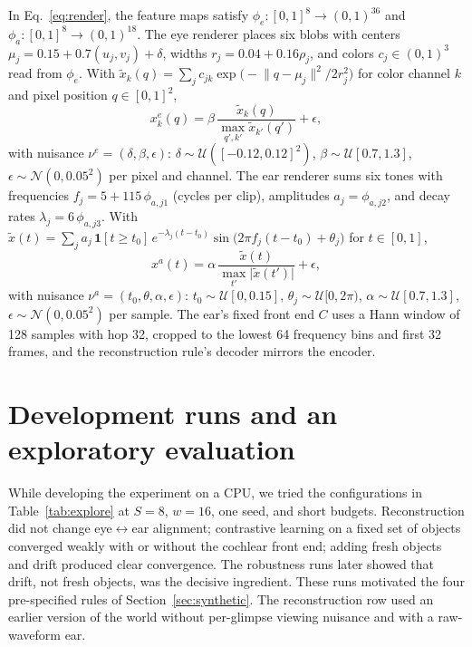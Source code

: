 \documentclass[11pt]{article}
\newcommand{\lr}{\ensuremath{\leftrightarrow}}
\begin{document}
In Eq.~\eqref{eq:render}, the feature maps satisfy $\phi_e:[0,1]^8\to(0,1)^{36}$ and $\phi_a:[0,1]^8\to(0,1)^{18}$. The eye renderer places six blobs with centers $\mu_j=0.15+0.7(u_j,v_j)+\delta$, widths $r_j=0.04+0.16\rho_j$, and colors $c_j\in(0,1)^3$ read from $\phi_e$. With $\tilde x_k(q)=\sum_j c_{jk}\exp\!\big(-\lVert q-\mu_j\rVert^2/2r_j^2\big)$ for color channel $k$ and pixel position $q\in[0,1]^2$,
\begin{equation}
  x^{e}_k(q)=\beta\,\frac{\tilde x_k(q)}{\max_{q',k'}\tilde x_{k'}(q')}+\epsilon ,
\end{equation}
with nuisance $\nu^{e}=(\delta,\beta,\epsilon)$: $\delta\sim\mathcal U([-0.12,0.12]^2)$, $\beta\sim\mathcal U[0.7,1.3]$, $\epsilon\sim\mathcal N(0,0.05^2)$ per pixel and channel. The ear renderer sums six tones with frequencies $f_j=5+115\,\phi_{a,j1}$ (cycles per clip), amplitudes $a_j=\phi_{a,j2}$, and decay rates $\lambda_j=6\,\phi_{a,j3}$. With $\tilde x(t)=\sum_j a_j\,\mathbf 1[t\ge t_0]\,e^{-\lambda_j(t-t_0)}\sin\!\big(2\pi f_j(t-t_0)+\theta_j\big)$ for $t\in[0,1]$,
\begin{equation}
  x^{a}(t)=\alpha\,\frac{\tilde x(t)}{\max_{t'}\lvert\tilde x(t')\rvert}+\epsilon,
\end{equation}
with nuisance $\nu^{a}=(t_0,\theta,\alpha,\epsilon)$: $t_0\sim\mathcal U[0,0.15]$, $\theta_j\sim\mathcal U[0,2\pi)$, $\alpha\sim\mathcal U[0.7,1.3]$, $\epsilon\sim\mathcal N(0,0.05^2)$ per sample. The ear's fixed front end $C$ uses a Hann window of 128 samples with hop 32, cropped to the lowest 64 frequency bins and first 32 frames, and the reconstruction rule's decoder mirrors the encoder.

\section{Development runs and an exploratory evaluation}
\label{app:dev}

While developing the experiment on a CPU, we tried the configurations in Table~\ref{tab:explore} at $S=8$, $w=16$, one seed, and short budgets. Reconstruction did not change eye\lr{}ear alignment; contrastive learning on a fixed set of objects converged weakly with or without the cochlear front end; adding fresh objects and drift produced clear convergence. The robustness runs later showed that drift, not fresh objects, was the decisive ingredient. These runs motivated the four pre-specified rules of Section~\ref{sec:synthetic}. The reconstruction row used an earlier version of the world without per-glimpse viewing nuisance and with a raw-waveform ear.
\end{document}
